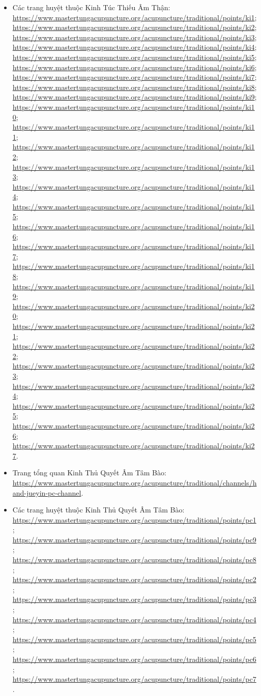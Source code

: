 \documentclass[12pt,a4paper]{article}
\begin{document}
\begin{itemize}
  \item Các trang huyệt thuộc Kinh Túc Thiếu Âm Thận: \url{https://www.mastertungacupuncture.org/acupuncture/traditional/points/ki1}; \url{https://www.mastertungacupuncture.org/acupuncture/traditional/points/ki2}; \url{https://www.mastertungacupuncture.org/acupuncture/traditional/points/ki3}; \url{https://www.mastertungacupuncture.org/acupuncture/traditional/points/ki4}; \url{https://www.mastertungacupuncture.org/acupuncture/traditional/points/ki5}; \url{https://www.mastertungacupuncture.org/acupuncture/traditional/points/ki6}; \url{https://www.mastertungacupuncture.org/acupuncture/traditional/points/ki7}; \url{https://www.mastertungacupuncture.org/acupuncture/traditional/points/ki8}; \url{https://www.mastertungacupuncture.org/acupuncture/traditional/points/ki9}; \url{https://www.mastertungacupuncture.org/acupuncture/traditional/points/ki10}; \url{https://www.mastertungacupuncture.org/acupuncture/traditional/points/ki11}; \url{https://www.mastertungacupuncture.org/acupuncture/traditional/points/ki12}; \url{https://www.mastertungacupuncture.org/acupuncture/traditional/points/ki13}; \url{https://www.mastertungacupuncture.org/acupuncture/traditional/points/ki14}; \url{https://www.mastertungacupuncture.org/acupuncture/traditional/points/ki15}; \url{https://www.mastertungacupuncture.org/acupuncture/traditional/points/ki16}; \url{https://www.mastertungacupuncture.org/acupuncture/traditional/points/ki17}; \url{https://www.mastertungacupuncture.org/acupuncture/traditional/points/ki18}; \url{https://www.mastertungacupuncture.org/acupuncture/traditional/points/ki19}; \url{https://www.mastertungacupuncture.org/acupuncture/traditional/points/ki20}; \url{https://www.mastertungacupuncture.org/acupuncture/traditional/points/ki21}; \url{https://www.mastertungacupuncture.org/acupuncture/traditional/points/ki22}; \url{https://www.mastertungacupuncture.org/acupuncture/traditional/points/ki23}; \url{https://www.mastertungacupuncture.org/acupuncture/traditional/points/ki24}; \url{https://www.mastertungacupuncture.org/acupuncture/traditional/points/ki25}; \url{https://www.mastertungacupuncture.org/acupuncture/traditional/points/ki26}; \url{https://www.mastertungacupuncture.org/acupuncture/traditional/points/ki27}.
  \item Trang tổng quan Kinh Thủ Quyết Âm Tâm Bào: \url{https://www.mastertungacupuncture.org/acupuncture/traditional/channels/hand-jueyin-pc-channel}.
  \item Các trang huyệt thuộc Kinh Thủ Quyết Âm Tâm Bào: \url{https://www.mastertungacupuncture.org/acupuncture/traditional/points/pc1}; \url{https://www.mastertungacupuncture.org/acupuncture/traditional/points/pc9}; \url{https://www.mastertungacupuncture.org/acupuncture/traditional/points/pc8}; \url{https://www.mastertungacupuncture.org/acupuncture/traditional/points/pc2}; \url{https://www.mastertungacupuncture.org/acupuncture/traditional/points/pc3}; \url{https://www.mastertungacupuncture.org/acupuncture/traditional/points/pc4}; \url{https://www.mastertungacupuncture.org/acupuncture/traditional/points/pc5}; \url{https://www.mastertungacupuncture.org/acupuncture/traditional/points/pc6}; \url{https://www.mastertungacupuncture.org/acupuncture/traditional/points/pc7}.

\end{itemize}
\end{document}
